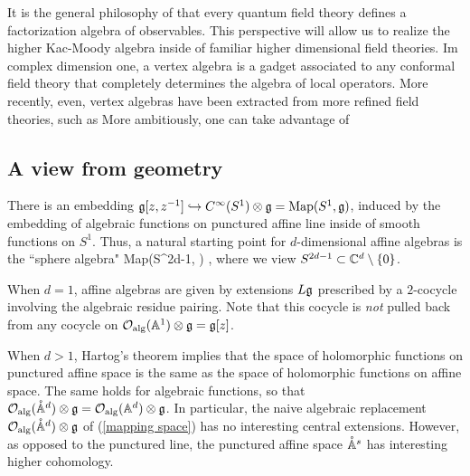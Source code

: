 It is the general philosophy of \cite{CG1,CG2} that every quantum field theory defines a factorization algebra of observables.
This perspective will allow us to realize the higher Kac-Moody algebra inside of familiar higher dimensional field theories. 
Im complex dimension one, a vertex algebra is a gadget associated to any conformal field theory that completely determines the algebra of local operators.  
More recently, even, vertex algebras have been extracted from more refined field theories, such as 
More ambitiously, one can take advantage of



\subsection*{A view from geometry}

There is an embedding $\mathfrak g[z,z^{-1}] \hookrightarrow C^\infty(S^1) \otimes \mathfrak g = {\rm Map}(S^1, \mathfrak g)$, induced by the embedding of algebraic functions on punctured affine line inside of smooth functions on $S^1$. 
Thus, a natural starting point for $d$-dimensional affine algebras is the ``sphere algebra" 
\beqn\label{mapping space}
{\rm Map}(S^{2d-1}, \fg) ,
\eeqn
where we view $S^{2d-1} \subset \mathbb C^d \setminus \{0\}$. 

When $d=1$, affine algebras are given by extensions $L\mathfrak g$ prescribed by a $2$-cocycle involving the algebraic residue pairing. 
Note that this cocycle is {\em not} pulled back from any cocycle on $\mathcal O_{\rm alg}(\mathbb A^1) \otimes \mathfrak g = \mathfrak g[z]$. 

When $d > 1$, Hartog's theorem implies that the space of holomorphic functions on punctured affine space is the same as the space of holomorphic functions on affine space.
The same holds for algebraic functions, so that $\mathcal O_{\rm alg}(\mathring{\mathbb A}^{d}) \otimes \mathfrak g = \mathcal O_{\rm alg}(\mathbb A^d) \otimes \mathfrak g$. 
In particular, the naive algebraic replacement $\mathcal O_{\rm alg}(\mathring{\mathbb A}^{d}) \otimes \mathfrak g$ of (\ref{mapping space}) has no interesting central extensions. 
However, as opposed to the punctured line, the punctured affine space $\mathring{\mathbb A}^{s}$ has interesting higher cohomology. 

